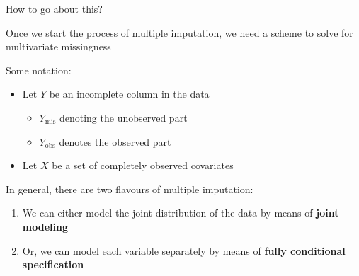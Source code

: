 \documentclass[ignorenonframetext,]{beamer}
\providecommand{\tightlist}{%
  \setlength{\itemsep}{0pt}\setlength{\parskip}{0pt}}
\begin{document}
\begin{frame}{How to go about this?}
\protect\hypertarget{how-to-go-about-this}{}

Once we start the process of multiple imputation, we need a scheme to
solve for multivariate missingness

Some notation:

\begin{itemize}
\item
  Let \(Y\) be an incomplete column in the data

  \begin{itemize}
  \tightlist
  \item
    \(Y_\mathrm{mis}\) denoting the unobserved part
  \item
    \(Y_\mathrm{obs}\) denotes the observed part
  \end{itemize}
\item
  Let \(X\) be a set of completely observed covariates
\end{itemize}

In general, there are two flavours of multiple imputation:

\begin{enumerate}
\tightlist
\item
  We can either model the joint distribution of the data by means of
  \textbf{joint modeling}
\item
  Or, we can model each variable separately by means of \textbf{fully
  conditional specification}
\end{enumerate}

\end{frame}
\end{document}
